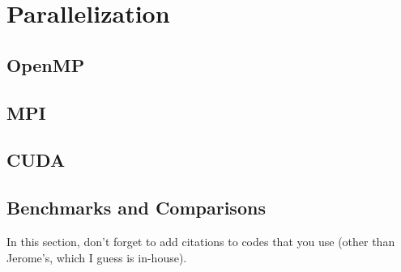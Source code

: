 \newpage
\section{Parallelization}

\subsection{OpenMP}
\subsection{MPI}
\subsection{CUDA}

\subsection{Benchmarks and Comparisons}

In this section, don't forget to add citations to codes that you use (other than Jerome's, which I guess is in-house). 


